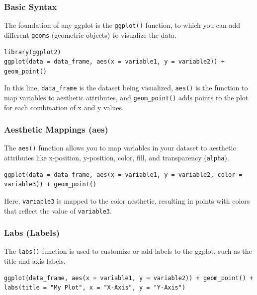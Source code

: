 \documentclass[
]{book}
\begin{document}
\subsubsection*{Basic Syntax}\label{basic-syntax}

The foundation of any ggplot is the \texttt{ggplot()} function, to which you can add different \texttt{geoms} (geometric objects) to visualize the data.

\begin{verbatim}
library(ggplot2)
ggplot(data = data_frame, aes(x = variable1, y = variable2)) + geom_point()
\end{verbatim}

In this line, \texttt{data\_frame} is the dataset being visualized, \texttt{aes()} is the function to map variables to aesthetic attributes, and \texttt{geom\_point()} adds points to the plot for each combination of x and y values.

\subsubsection*{Aesthetic Mappings (aes)}\label{aesthetic-mappings-aes}

The \texttt{aes()} function allows you to map variables in your dataset to aesthetic attributes like x-position, y-position, color, fill, and transparency (\texttt{alpha}).

\begin{verbatim}
ggplot(data = data_frame, aes(x = variable1, y = variable2, color = variable3)) + geom_point()
\end{verbatim}

Here, \texttt{variable3} is mapped to the color aesthetic, resulting in points with colors that reflect the value of \texttt{variable3}.

\subsubsection*{Labs (Labels)}\label{labs-labels}

The \texttt{labs()} function is used to customize or add labels to the ggplot, such as the title and axis labels.

\begin{verbatim}
ggplot(data_frame, aes(x = variable1, y = variable2)) + geom_point() + labs(title = "My Plot", x = "X-Axis", y = "Y-Axis")
\end{verbatim}
\end{document}
